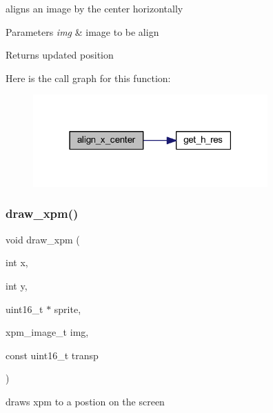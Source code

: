 aligns an image by the center horizontally 


\begin{DoxyParams}{Parameters}
{\em img} & image to be align \\
\hline
\end{DoxyParams}
\begin{DoxyReturn}{Returns}
updated position 
\end{DoxyReturn}
Here is the call graph for this function\+:
\nopagebreak
\begin{figure}[H]
\begin{center}
\leavevmode
\includegraphics[width=255pt]{group__xpm_ga7b37b2adae7cdc46c3092db82641ba9a_cgraph}
\end{center}
\end{figure}
\mbox{\label{group__xpm_ga92528cf77a6ddfa6a4844c50896600a7}} 
\subsubsection{\texorpdfstring{draw\_xpm()}{draw\_xpm()}}
{\footnotesize\ttfamily void draw\+\_\+xpm (\begin{DoxyParamCaption}\item[{int}]{x,  }\item[{int}]{y,  }\item[{uint16\+\_\+t $\ast$}]{sprite,  }\item[{xpm\+\_\+image\+\_\+t}]{img,  }\item[{const uint16\+\_\+t}]{transp }\end{DoxyParamCaption})}



draws xpm to a postion on the screen 



